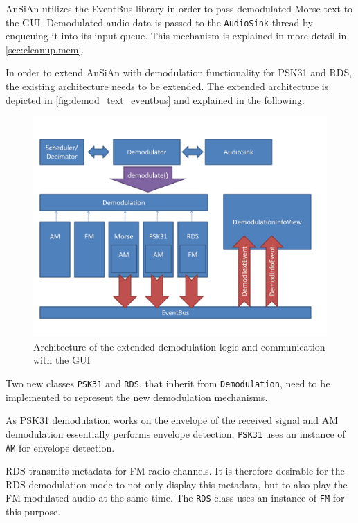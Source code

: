 \ac{AnSiAn} utilizes the EventBus library in order to pass demodulated Morse text
to the \ac{GUI}. Demodulated audio data is passed to the
\texttt{AudioSink} thread by enqueuing it into its input queue.
This mechanism is explained in more detail in \autoref{sec:cleanup.mem}.


In order to extend \ac{AnSiAn} with demodulation functionality for \ac{PSK31} and \ac{RDS}, 
the existing architecture needs to be extended. The extended architecture is
depicted in \autoref{fig:demod_text_eventbus} and explained in the following.

\begin{figure}
	\centering
	\includegraphics[width=1\linewidth]{gfx/demod_text_eventbus.png}
	\caption{Architecture of the extended demodulation logic and communication with the GUI}
	\label{fig:demod_text_eventbus}
\end{figure}

Two new classes \texttt{PSK31} and \texttt{RDS}, that inherit from
\texttt{Demodulation}, need to be implemented to represent the new demodulation 
mechanisms.

As \ac{PSK31} demodulation works on the envelope of the received signal
and \ac{AM} demodulation essentially performs envelope detection, \texttt{PSK31}
uses an instance of \texttt{AM} for envelope detection.

\ac{RDS} transmits metadata for \ac{FM} radio channels. It is therefore desirable for the 
\ac{RDS} demodulation mode to not only display this metadata, but to also play the 
\ac{FM}-modulated audio at the same time. The \texttt{RDS} class uses an
instance of \texttt{FM} for this purpose.

